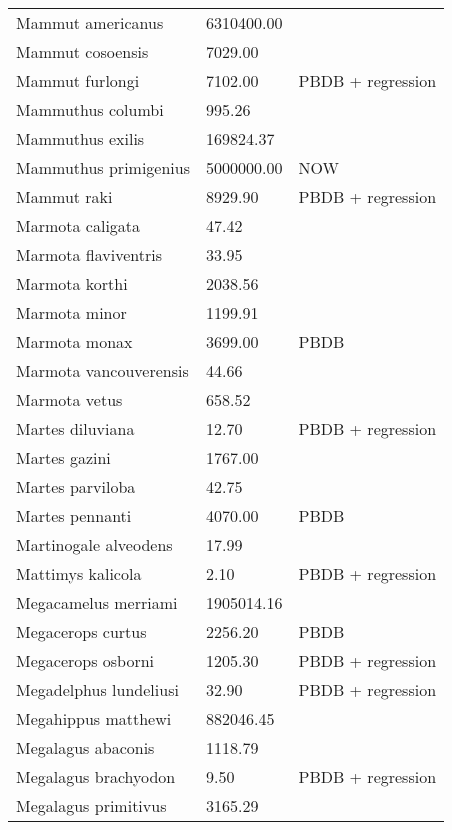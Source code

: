 \begin{longtable}{p{} p{} p{}}
    Mammut americanus & 6310400.00 & \cite{McKenna2011} \\ 
    Mammut cosoensis & 7029.00 & \cite{Secord2008a} \\ 
    Mammut furlongi & 7102.00 & PBDB + regression \\ 
    Mammuthus columbi & 995.26 & \cite{Smith2004} \\ 
    Mammuthus exilis & 169824.37 & \cite{Raia2012f} \\ 
    Mammuthus primigenius & 5000000.00 & NOW \\ 
    Mammut raki & 8929.90 & PBDB + regression \\ 
    Marmota caligata & 47.42 & \cite{Smith2004} \\ 
    Marmota flaviventris & 33.95 & \cite{Smith2004} \\ 
    Marmota korthi & 2038.56 & \cite{Tomiya2013} \\ 
    Marmota minor & 1199.91 & \cite{Tomiya2013} \\ 
    Marmota monax & 3699.00 & PBDB \\ 
    Marmota vancouverensis & 44.66 & \cite{Smith2004} \\ 
    Marmota vetus & 658.52 & \cite{Tomiya2013} \\ 
    Martes diluviana & 12.70 & PBDB + regression \\ 
    Martes gazini & 1767.00 & \cite{McKenna2011} \\ 
    Martes parviloba & 42.75 & \cite{Macdonald1951} \\ 
    Martes pennanti & 4070.00 & PBDB \\ 
    Martinogale alveodens & 17.99 & \cite{Tomiya2013} \\ 
    Mattimys kalicola & 2.10 & PBDB + regression \\ 
    Megacamelus merriami & 1905014.16 & \cite{Tomiya2013} \\ 
    Megacerops curtus & 2256.20 & PBDB \\ 
    Megacerops osborni & 1205.30 & PBDB + regression \\ 
    Megadelphus lundeliusi & 32.90 & PBDB + regression \\ 
    Megahippus matthewi & 882046.45 & \cite{Tomiya2013} \\ 
    Megalagus abaconis & 1118.79 & \cite{Tomiya2013} \\ 
    Megalagus brachyodon & 9.50 & PBDB + regression \\ 
    Megalagus primitivus & 3165.29 & \cite{Tomiya2013} \\ 

\end{longtable}
